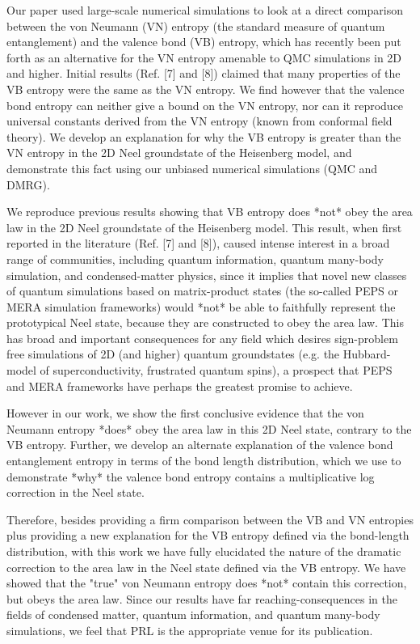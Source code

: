 Our paper used large-scale numerical simulations to look at a direct comparison between the von Neumann (VN) entropy (the standard measure of quantum entanglement) and the valence bond (VB)  entropy, which has recently been put forth as an alternative for the VN entropy amenable to QMC simulations in 2D and higher.  Initial results (Ref. [7] and [8]) claimed that many properties of the VB entropy were the same as the VN entropy.  We find however that the valence bond entropy can neither give a bound on the VN entropy, nor can it reproduce universal constants derived from the VN entropy (known from conformal field theory).  We develop an explanation for why the VB entropy is greater than the VN entropy in the  2D Neel groundstate of the Heisenberg model, and demonstrate this fact using our unbiased numerical simulations (QMC and DMRG).

We reproduce previous results showing that VB entropy does *not* obey the area law in the 2D Neel groundstate of the Heisenberg model.  This result, when first reported in the literature (Ref. [7] and [8]), caused intense interest in a broad range of communities, including quantum information, quantum many-body simulation, and condensed-matter physics, since it implies that novel new classes of quantum simulations based on matrix-product states (the so-called PEPS or MERA simulation frameworks) would *not* be able to faithfully represent the prototypical Neel state, because they are constructed to obey the area law.  This has broad and important consequences for any field which desires sign-problem free simulations of 2D (and higher) quantum groundstates (e.g. the Hubbard-model of superconductivity, frustrated quantum spins), a prospect that PEPS and MERA frameworks have perhaps the greatest promise to achieve.

However in our work, we show the first conclusive evidence that the von Neumann entropy *does* obey the area law in this 2D Neel state, contrary to the VB entropy.  Further, we develop an alternate explanation of the valence bond entanglement entropy in terms of the bond length distribution, which we use to demonstrate *why* the valence bond entropy contains a multiplicative log correction in the Neel state.

Therefore, besides providing a firm comparison between the VB and VN entropies plus providing a new explanation for the VB entropy defined via the bond-length distribution, with this work we have fully elucidated the nature of the dramatic correction to the area law in the Neel state defined via the VB entropy.  We have showed that the "true" von Neumann entropy does *not* contain this correction, but obeys the area law. Since our results have far reaching-consequences in the fields of condensed matter, quantum information, and quantum many-body simulations, we feel that PRL is the appropriate venue for its publication.
